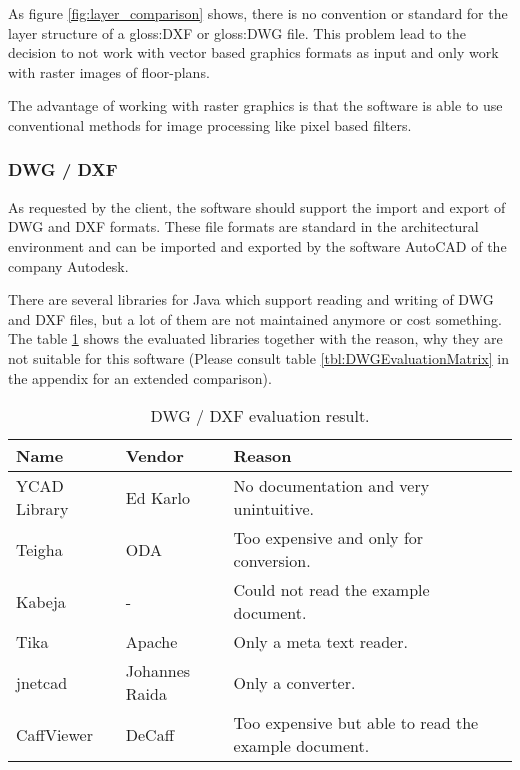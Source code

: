 As figure \ref{fig:layer_comparison} shows, there is no convention or standard for the layer structure of a \gls{gloss:DXF} or \gls{gloss:DWG} file. This problem lead to the decision to not work with vector based graphics formats as input and only work with raster images of floor-plans.

The advantage of working with raster graphics is that the software is able to use conventional methods for image processing like pixel based filters.

\subsubsection{DWG / DXF}
As requested by the client, the software should support the import and export of DWG and DXF formats. These file formats are standard in the architectural environment and can be imported and exported by the software AutoCAD of the company Autodesk.

There are several libraries for Java which support reading and writing of DWG and DXF files, but a lot of them are not maintained anymore or cost something. The table \ref{tbl:DWGEvaluationResult} shows the evaluated libraries together with the reason, why they are not suitable for this software (Please consult table \ref{tbl:DWGEvaluationMatrix} in the appendix for an extended comparison).

\begin{table}[h]
\centering
\caption{DWG / DXF evaluation result.}
\label{tbl:DWGEvaluationResult}
\begin{tabular}{@{}lll@{}}
\toprule
Name         & Vendor         & Reason                                               \\ \midrule
YCAD Library & Ed Karlo       & No documentation and very unintuitive.                \\
Teigha       & ODA            & Too expensive and only for conversion.               \\
Kabeja       & -              & Could not read the example document.                 \\
Tika         & Apache         & Only a meta text reader.                             \\
jnetcad      & Johannes Raida & Only a converter.                                    \\
CaffViewer   & DeCaff         & Too expensive but able to read the example document. \\ \bottomrule
\end{tabular}
\end{table}

